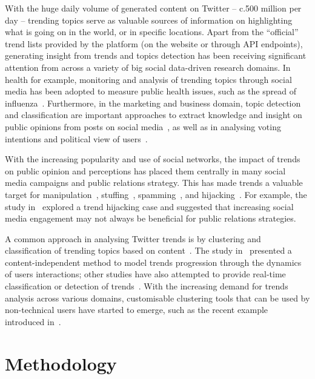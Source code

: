 \documentclass{llncs}
\begin{document}
With the huge daily volume of generated content on Twitter -- c.500
million per day -- trending topics serve as valuable sources of
information on highlighting what is going on in the world, or in
specific locations. Apart from the ``official'' trend lists provided
by the platform (on the website or through API endpoints), generating
insight from trends and topics detection has been receiving
significant attention from across a variety of big social data-driven
research domains. In health for example, monitoring and analysis of
trending topics through social media has been adopted to measure
public health issues, such as the spread of
influenza~\cite{Achrekar2011,Parker2013,Parker2015,Majak2018}. Furthermore,
in the marketing and business domain, topic detection and
classification are important approaches to extract knowledge and
insight on public opinions from posts on social
media~\cite{Bello2013}, as well as in analysing voting intentions and
political view of users~\cite{Fang2015}.

With the increasing popularity and use of social networks, the impact
of trends on public opinion and perceptions has placed them centrally
in many social media campaigns and public relations strategy. This has
made trends a valuable target for manipulation~\cite{Zhang2017},
stuffing~\cite{Irani2010}, spamming~\cite{Sedhai2015,Chu2012}, and
hijacking~\cite{VanDam2016}. For example, the study
in~\cite{Sanderson2016} explored a trend hijacking case and suggested
that increasing social media engagement may not always be beneficial
for public relations strategies.

A common approach in analysing Twitter trends is by clustering and
classification of trending topics based on
content~\cite{Zubiaga2011,Benhardus2013,Ferragina2015,albishry-et-al:iccci2017}. The
study in~\cite{TenThij2016} presented a content-independent method to
model trends progression through the dynamics of users interactions;
other studies have also attempted to provide real-time classification
or detection of trends~\cite{Mathioudakis2010,Zubiaga2014}. With the
increasing demand for trends analysis across various domains,
customisable clustering tools that can be used by non-technical users
have started to emerge, such as the recent example introduced
in~\cite{Arn2018}.


\section{Methodology}\label{method}
\end{document}
